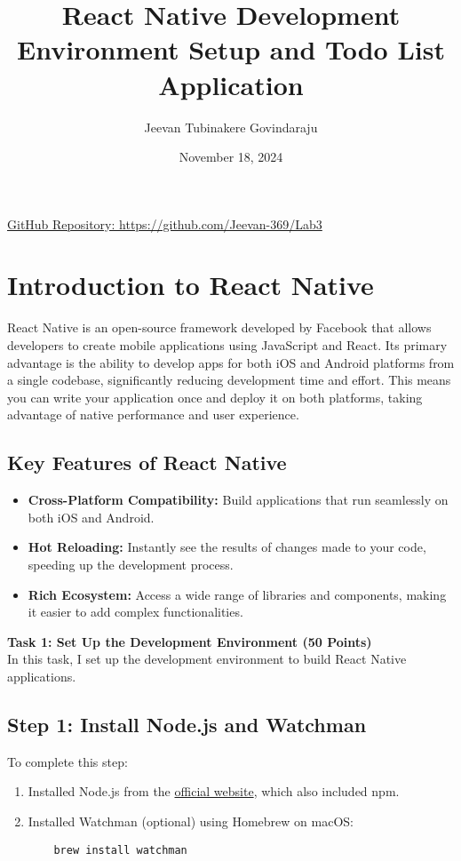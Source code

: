 \documentclass{article}
\title{React Native Development Environment Setup and Todo List Application}
\author{Jeevan Tubinakere Govindaraju}
\date{November 18, 2024}
\begin{document}
\maketitle

\begin{center}
\href{https://github.com/Jeevan-369/Lab3}{GitHub Repository: https://github.com/Jeevan-369/Lab3}
\end{center}

\section{Introduction to React Native}
React Native is an open-source framework developed by Facebook that allows developers to create mobile applications using JavaScript and React. Its primary advantage is the ability to develop apps for both iOS and Android platforms from a single codebase, significantly reducing development time and effort. This means you can write your application once and deploy it on both platforms, taking advantage of native performance and user experience.

\subsection{Key Features of React Native}
\begin{itemize}
    \item \textbf{Cross-Platform Compatibility:} Build applications that run seamlessly on both iOS and Android.
    \item \textbf{Hot Reloading:} Instantly see the results of changes made to your code, speeding up the development process.
    \item \textbf{Rich Ecosystem:} Access a wide range of libraries and components, making it easier to add complex functionalities.
\end{itemize}


\noindent\textbf{\Large Task 1: Set Up the Development Environment (50 Points)}\\[0.5cm]
\noindent In this task, I set up the development environment to build React Native applications.\\[1cm]

\subsection{Step 1: Install Node.js and Watchman}
To complete this step:
\begin{enumerate}
    \item Installed Node.js from the \href{https://nodejs.org/en}{official website}, which also included npm.
    \item Installed Watchman (optional) using Homebrew on macOS:
    \begin{verbatim}
    brew install watchman
    \end{verbatim}
\end{enumerate}
\end{document}
